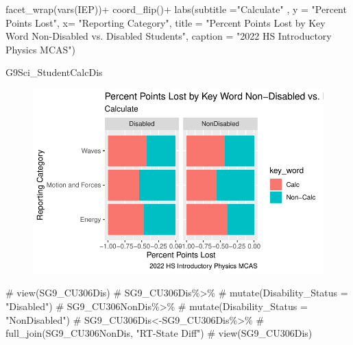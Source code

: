 \documentclass[
  letterpaper,
  DIV=11,
  numbers=noendperiod]{scrartcl}
\newenvironment{Shaded}{\begin{snugshade}}{\end{snugshade}}
\newcommand{\AttributeTok}[1]{\textcolor[rgb]{0.40,0.45,0.13}{#1}}
\newcommand{\CommentTok}[1]{\textcolor[rgb]{0.37,0.37,0.37}{#1}}
\newcommand{\FunctionTok}[1]{\textcolor[rgb]{0.28,0.35,0.67}{#1}}
\newcommand{\NormalTok}[1]{\textcolor[rgb]{0.00,0.23,0.31}{#1}}
\newcommand{\SpecialCharTok}[1]{\textcolor[rgb]{0.37,0.37,0.37}{#1}}
\newcommand{\StringTok}[1]{\textcolor[rgb]{0.13,0.47,0.30}{#1}}
\begin{document}
\begin{Shaded}
\begin{Highlighting}[]
  \FunctionTok{facet\_wrap}\NormalTok{(}\FunctionTok{vars}\NormalTok{(IEP))}\SpecialCharTok{+} \FunctionTok{coord\_flip}\NormalTok{()}\SpecialCharTok{+}
   \FunctionTok{labs}\NormalTok{(}\AttributeTok{subtitle =}\StringTok{"Calculate"}\NormalTok{ ,}
       \AttributeTok{y =} \StringTok{"Percent Points Lost"}\NormalTok{,}
       \AttributeTok{x=} \StringTok{"Reporting Category"}\NormalTok{,}
       \AttributeTok{title =} \StringTok{"Percent Points Lost by Key Word Non{-}Disabled vs. Disabled Students"}\NormalTok{,}
      \AttributeTok{caption =} \StringTok{"2022 HS Introductory Physics MCAS"}\NormalTok{)}

\NormalTok{G9Sci\_StudentCalcDis}
\end{Highlighting}
\end{Shaded}

\begin{figure}[H]

{\centering \includegraphics{theresaSzczepanski_final_files/figure-pdf/unnamed-chunk-29-1.pdf}

}

\end{figure}

\begin{Shaded}
\begin{Highlighting}[]
\CommentTok{\# view(SG9\_CU306Dis)}
\CommentTok{\# SG9\_CU306Dis\%\textgreater{}\%}
\CommentTok{\#   mutate(Disability\_Status = "Disabled")}
\CommentTok{\# SG9\_CU306NonDis\%\textgreater{}\%}
\CommentTok{\#   mutate(Disability\_Status = "NonDisabled")}
\CommentTok{\# SG9\_CU306Dis\textless{}{-}SG9\_CU306Dis\%\textgreater{}\%}
\CommentTok{\#   full\_join(SG9\_CU306NonDis, "RT{-}State Diff")}
\CommentTok{\# view(SG9\_CU306Dis)}
\end{Highlighting}
\end{Shaded}
\end{document}
